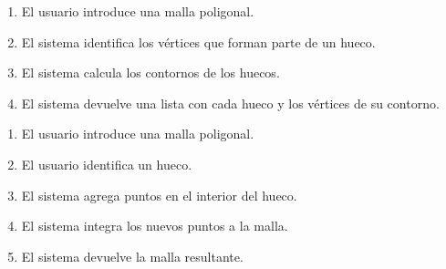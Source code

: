 		\CUNormal
		\begin{enumerate}
			\item El usuario introduce una malla poligonal.
			\item El sistema identifica los vértices que forman parte de un hueco.
			\item El sistema calcula los contornos de los huecos.
			\item El sistema devuelve una lista con cada hueco y los vértices de su contorno.
		\end{enumerate}

		\CUNormal
		\begin{enumerate}
			\item El usuario introduce una malla poligonal.
			\item El usuario identifica un hueco. 
			\item El sistema agrega puntos en el interior del hueco.
			\item El sistema integra los nuevos puntos a la malla.
			\item El sistema devuelve la malla resultante.
		\end{enumerate}
